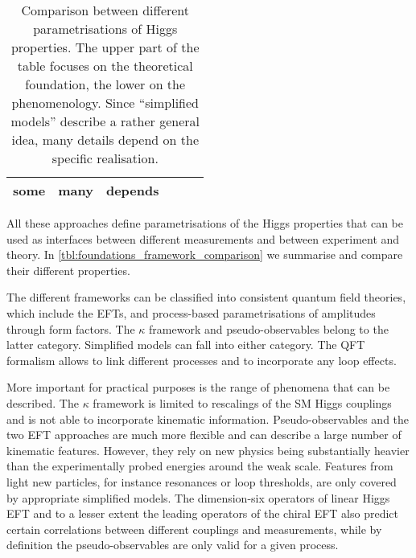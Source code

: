 \begin{table}
\begin{tabularx}{\textwidth}{LLLLLL}
    some & 
    many &
    depends \\
    \bottomrule
  \end{tabularx}
  \caption[Comparison between different parametrisations of Higgs properties]{Comparison
    between different parametrisations of Higgs properties. The upper part of the table
    focuses on the theoretical foundation, the lower on the phenomenology.
    Since ``simplified models'' describe a rather general idea, many
    details depend on the specific realisation.}
  \label{tbl:foundations_framework_comparison}
\end{table}

All these approaches define parametrisations of the Higgs properties
that can be used as interfaces between different measurements and
between experiment and theory. In
\autoref{tbl:foundations_framework_comparison} we summarise and
compare their different properties.

The different frameworks can be classified into consistent quantum
field theories, which include the EFTs, and process-based
parametrisations of amplitudes through form factors. The $\kappa$
framework and pseudo-observables belong to the latter
category. Simplified models can fall into either category. The QFT
formalism allows to link different processes and to incorporate any
loop effects.

More important for practical purposes is the range of phenomena that
can be described. The $\kappa$ framework is limited to rescalings of
the SM Higgs couplings and is not able to incorporate kinematic
information. Pseudo-observables and the two EFT approaches are much
more flexible and can describe a large number of kinematic
features. However, they rely on new physics being substantially
heavier than the experimentally probed energies around the weak
scale. Features from light new particles, for instance resonances or
loop thresholds, are only covered by appropriate simplified
models. The dimension-six operators of linear Higgs EFT and to a
lesser extent the leading operators of the chiral EFT also predict
certain correlations between different couplings and measurements,
while by definition the pseudo-observables are only valid for a given
process.

